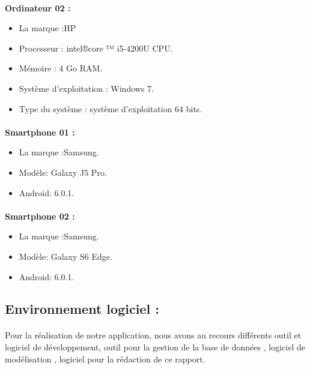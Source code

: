 \documentclass[12pt, openany]{report}
\begin{document}
\paragraph{}\textbf{Ordinateur 02 :}\\[0.4cm]
	\begin{itemize}\renewcommand {\labelitemi }{$\bullet $}
		\item La marque :HP
		\item Processeur : intel®core ™ i5-4200U CPU.
		\item Mémoire : 4 Go RAM. 
		\item Système d’exploitation : Windows 7. 
		\item Type du système : système d’exploitation 64 bits.
	\end{itemize}
\paragraph{}\textbf{Smartphone 01 :}\\[0.4cm]
	\begin{itemize}\renewcommand {\labelitemi }{$\bullet $}
	\item La marque :Samsung.
	\item Modèle: Galaxy J5 Pro.
	\item Android: 6.0.1. 
	\end{itemize}
\paragraph{}\textbf{Smartphone 02 :}\\[0.4cm]
	\begin{itemize}\renewcommand {\labelitemi }{$\bullet $}
	\item La marque :Samsung.
	\item Modèle: Galaxy S6 Edge.
	\item Android: 6.0.1. 
	\end{itemize}
\subsection{Environnement logiciel : }
\paragraph{}Pour la réalisation de notre application, nous avons au recours différents outil et logiciel de développement, outil pour la gestion de la base de données , logiciel de modélisation , logiciel pour la rédaction de ce rapport.
\end{document}
